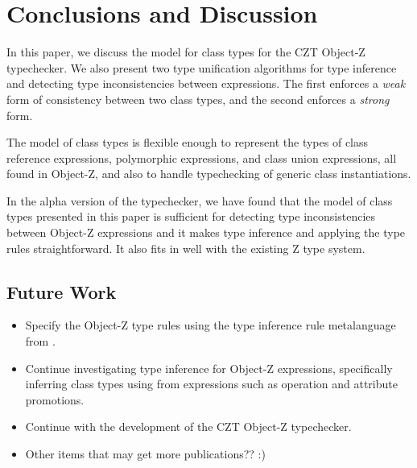 \section{Conclusions and Discussion}

In this paper, we discuss the model for class types for the CZT
Object-Z typechecker. We also present two type unification algorithms
for type inference and detecting type inconsistencies between
expressions. The first enforces a {\em weak} form of consistency
between two class types, and the second enforces a {\em strong} form.

The model of class types is flexible enough to represent the types of
class reference expressions, polymorphic expressions, and class union
expressions, all found in Object-Z, and also to handle typechecking of
generic class instantiations.

In the alpha version of the typechecker, we have found that the model
of class types presented in this paper is sufficient for detecting
type inconsistencies between Object-Z expressions and it makes type
inference and applying the type rules straightforward. It also fits in
well with the existing Z type system.

\subsection{Future Work}

\begin{itemize}
  \item Specify the Object-Z type rules using the type inference rule
  metalanguage from \theStandard \cite{isoz}.
  \item Continue investigating type inference for Object-Z
  expressions, specifically inferring class types using from
  expressions such as operation and attribute promotions.
  \item Continue with the development of the CZT Object-Z typechecker.
  \item Other items that may get more publications?? :)
\end{itemize}
